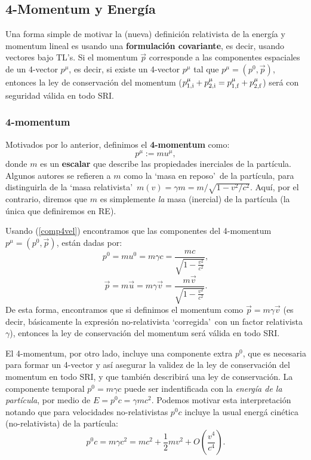 \subsection{4-Momentum y Energía}

Una forma simple de motivar la (nueva) definición relativista de la energía y momentum lineal es usando una \textbf{formulación covariante}, es decir, usando vectores bajo TL's. Si el
momentum $\vec{p}$ corresponde a las componentes espaciales de un 4-vector
$p^\mu$, es decir, si existe un 4-vector $p^\mu$ tal que $p^\mu=(p^0,\vec{p})$, entonces la ley de conservación del momentum
($p^\mu_{\rm 1,i}+p^\mu_{2,\rm i}=p^\mu_{1,\rm f}+p^\mu_{2,\rm f}$) será con seguridad válida en
todo SRI.

\subsubsection{4-momentum}
Motivados por lo anterior, definimos el \textbf{4-momentum} como:
\begin{equation}
\boxed{p^\mu :=mu^\mu, \label{def4mom}}
\end{equation}
donde $m$ es un \textbf{escalar} que describe las propiedades inerciales de la
partícula. Algunos autores se refieren a $m$ como la `masa en reposo'\ de la
partícula, para distinguirla de la `masa relativista'\ $m(v)=\gamma
m={m}/{\sqrt{1-{v^2}/{c^2}}}$. Aquí, por el contrario, diremos que $m$
es simplemente \textit{la} masa (inercial) de la partícula (la única que
definiremos en RE).

Usando (\ref{comp4vel}) encontramos que las componentes del 4-momentum
$p^\mu=(p^0,\vec{p})$, están dadas por:
\begin{equation}
\boxed{p^0=m u^0=m\gamma c=\frac{mc}{\sqrt{1-\frac{v^2}{c^2}}}},
\end{equation}
\begin{equation}
\boxed{\vec{p}=m \vec{u}=m\gamma \vec{v}=\frac{m\vec{v}}{\sqrt{1-\frac{v^2}{c^2}}}.}
\end{equation}
De esta forma, encontramos que si definimos el momentum como
$\vec{p}=m\gamma\vec{v}$ (es decir, básicamente la expresión no-relativista
`corregida'\ con un factor relativista $\gamma$), entonces la ley de
conservación del momentum será válida en todo SRI.

El 4-momentum, por otro lado, incluye una componente extra $p^0$, que es
necesaria para formar un 4-vector y así asegurar la validez de la ley de
conservación del momentum en todo SRI, y que también describirá una ley de
conservación. La componente temporal $p^0=m\gamma c$ puede ser indentificada
con la \textit{energía de la partícula}, por medio de $E=p^0 c=\gamma mc^2$.
Podemos motivar esta interpretación notando que para velocidades
no-relativistas $p^0 c$ incluye la usual energá cinética (no-relativista) de
la partícula:
\begin{equation}
p^0c=m\gamma c^2=mc^2+\frac{1}{2}mv^2+O(\frac{v^4}{c^4}).
\end{equation}

